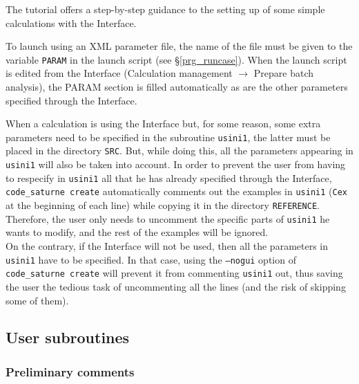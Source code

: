{{{\begin{list}{-}{}
\end{list}

The \CS tutorial \cite{tutorial} offers a step-by-step guidance to the setting
up of some simple calculations with the \CS Interface.

To launch \CS using an XML parameter file,
the name of the file must
be given to the variable \texttt{PARAM} in the launch script (see
\S\ref{prg_runcase}). When the launch
script is edited from the Interface (Calculation management $\rightarrow$
Prepare batch analysis), the PARAM section is filled automatically as are the
other parameters specified through the Interface.


When a calculation is using the Interface but, for some reason, some extra
parameters need to be specified in the subroutine \texttt{usini1}, the latter
must be placed in the directory \texttt{SRC}. But, while doing this, all the
parameters appearing in \texttt{usini1} will also be taken into account. In
order to prevent the user from having to respecify in \texttt{usini1} all that
he has already specified through the Interface, \texttt{code\_saturne~create} automatically
comments out the examples in \texttt{usini1} (\texttt{Cex} at the beginning of
each line) while copying it in the directory \texttt{REFERENCE}. Therefore, the user
only needs to uncomment the specific parts of \texttt{usini1} he wants to modify,
and the rest of the examples will be ignored.\\
On the contrary, if the Interface will not be used, then all the parameters in
\texttt{usini1} have to be specified. In that case, using the \texttt{--nogui}
option of \texttt{code\_saturne~create} will prevent it from commenting \texttt{usini1}
out, thus saving the user the tedious task of uncommenting all the lines (and
the risk of skipping some of them).

\subsection{User subroutines}
\label{prg_ssprgutilis}
\subsubsection{Preliminary comments}

}}}
